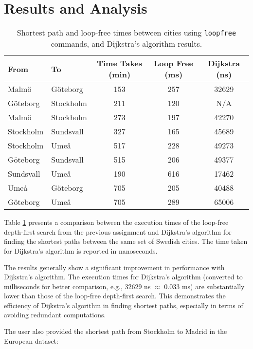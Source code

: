 \section*{Results and Analysis}

\begin{table}[h]
    \centering
    \begin{tabular}{|l|l|c|c|c|}
    \hline
    \textbf{From} & \textbf{To} & \textbf{Time Takes (min)} & \textbf{Loop Free (ms)} & \textbf{Dijkstra (ns)} \\
    \hline
    Malmö & Göteborg & 153 & 257 & 32629 \\
    Göteborg & Stockholm & 211 & 120 & N/A \\
    Malmö & Stockholm & 273 & 197 & 42270 \\
    Stockholm & Sundsvall & 327 & 165 & 45689 \\
    Stockholm & Umeå & 517 & 228 & 49273 \\
    Göteborg & Sundsvall & 515 & 206 & 49377 \\
    Sundsvall & Umeå & 190 & 616 & 17462 \\
    Umeå & Göteborg & 705 & 205 & 40488 \\
    Göteborg & Umeå & 705 & 289 & 65006 \\
    \hline
    \end{tabular}
    \caption{Shortest path and loop-free times between cities using \texttt{loopfree} commands, and Dijkstra's algorithm results.}
    \label{tab:city_paths_updated}
\end{table}

Table \ref{tab:city_paths_updated} presents a comparison between the execution times of the loop-free depth-first search from the previous assignment and Dijkstra's algorithm for finding the shortest paths between the same set of Swedish cities. The time taken for Dijkstra's algorithm is reported in nanoseconds.

The results generally show a significant improvement in performance with Dijkstra's algorithm. The execution times for Dijkstra's algorithm (converted to milliseconds for better comparison, e.g., 32629 ns $\approx$ 0.033 ms) are substantially lower than those of the loop-free depth-first search. This demonstrates the efficiency of Dijkstra's algorithm in finding shortest paths, especially in terms of avoiding redundant computations.

The user also provided the shortest path from Stockholm to Madrid in the European dataset:

